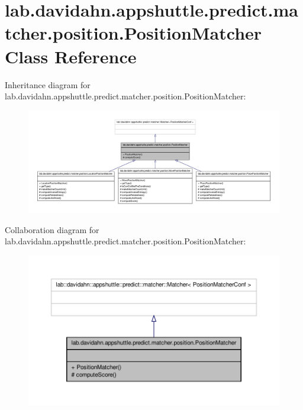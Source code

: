 \hypertarget{classlab_1_1davidahn_1_1appshuttle_1_1predict_1_1matcher_1_1position_1_1_position_matcher}{\section{lab.\-davidahn.\-appshuttle.\-predict.\-matcher.\-position.\-Position\-Matcher \-Class \-Reference}
\label{classlab_1_1davidahn_1_1appshuttle_1_1predict_1_1matcher_1_1position_1_1_position_matcher}
}


\-Inheritance diagram for lab.\-davidahn.\-appshuttle.\-predict.\-matcher.\-position.\-Position\-Matcher\-:
\nopagebreak
\begin{figure}[H]
\begin{center}
\leavevmode
\includegraphics[width=350pt]{classlab_1_1davidahn_1_1appshuttle_1_1predict_1_1matcher_1_1position_1_1_position_matcher__inherit__graph}
\end{center}
\end{figure}


\-Collaboration diagram for lab.\-davidahn.\-appshuttle.\-predict.\-matcher.\-position.\-Position\-Matcher\-:
\nopagebreak
\begin{figure}[H]
\begin{center}
\leavevmode
\includegraphics[width=350pt]{classlab_1_1davidahn_1_1appshuttle_1_1predict_1_1matcher_1_1position_1_1_position_matcher__coll__graph}
\end{center}
\end{figure}
